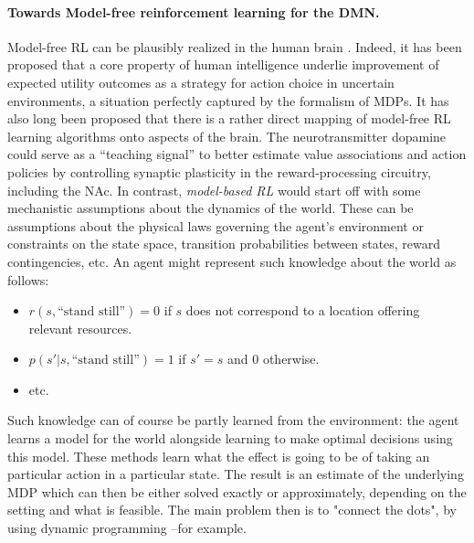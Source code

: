 \documentclass[10pt,letterpaper]{article}
\begin{document}
\paragraph*{Towards Model-free reinforcement learning for the DMN.}
Model-free RL can be plausibly realized in the human brain \citep{doherty2015structure, daw2014algorithmic}.
Indeed,
it has been proposed \citep{gershman2015computational} that a core property of human intelligence  underlie improvement
of expected utility outcomes as a strategy for action choice in uncertain
environments, a situation perfectly captured by the formalism of MDPs.
It has also long been proposed \citep{dayan2008decision} that there
is a rather direct mapping of model-free RL learning algorithms
onto aspects of the brain.
The neurotransmitter dopamine could serve
as a ``teaching signal'' to better estimate value associations
and action policies by controlling
synaptic plasticity in the reward-processing circuitry, including the NAc.
In contrast, \textit{model-based RL} would start off with some mechanistic assumptions about the dynamics of the world.
These can be assumptions about the physical laws governing the agent's environment or constraints on the state space, transition probabilities between states,
reward contingencies, etc.
An agent might represent such knowledge about the world as follows:
\begin{itemize}
\item $r(s, \text{``stand still''}) = 0$ if $s$ does not correspond to a location
offering relevant resources.
\item $p(s'|s,\text{``stand still''}) = 1$ if $s'=s$ and $0$ otherwise.
\item etc.
\end{itemize}
Such knowledge can of course be partly learned from the environment: the agent learns a model for the world alongside learning to make optimal decisions using this model. These methods learn what the effect is going to be of taking an particular action in a particular state. The result is an estimate of the underlying MDP which can then be either solved exactly or approximately, depending on the setting and what is feasible. The main problem then is to "connect the dots", by using dynamic programming --for example.
\end{document}
